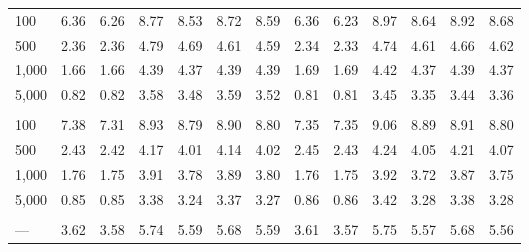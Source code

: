 \documentclass[AMA,STIX1COL,doublespace]{WileyNJD-v2}
\begin{document}
\begin{table}
\begin{tabular}[t]{lcccccccccccc}
\hline
\hspace{1em}100 & 6.36 & 6.26 & 8.77 & 8.53 & 8.72 & 8.59 & 6.36 & 6.23 & 8.97 & 8.64 & 8.92 & 8.68\\
\hspace{1em}500 & 2.36 & 2.36 & 4.79 & 4.69 & 4.61 & 4.59 & 2.34 & 2.33 & 4.74 & 4.61 & 4.66 & 4.62\\
\hspace{1em}1,000 & 1.66 & 1.66 & 4.39 & 4.37 & 4.39 & 4.39 & 1.69 & 1.69 & 4.42 & 4.37 & 4.39 & 4.37\\
\hspace{1em}5,000 & 0.82 & 0.82 & 3.58 & 3.48 & 3.59 & 3.52 & 0.81 & 0.81 & 3.45 & 3.35 & 3.44 & 3.36\\
\addlinespace[0.75em]
\multicolumn{13}{l}{\textbf{10 predictors, 490 junk}}\\
\hline
\hspace{1em}100 & 7.38 & 7.31 & 8.93 & 8.79 & 8.90 & 8.80 & 7.35 & 7.35 & 9.06 & 8.89 & 8.91 & 8.80\\
\hspace{1em}500 & 2.43 & 2.42 & 4.17 & 4.01 & 4.14 & 4.02 & 2.45 & 2.43 & 4.24 & 4.05 & 4.21 & 4.07\\
\hspace{1em}1,000 & 1.76 & 1.75 & 3.91 & 3.78 & 3.89 & 3.80 & 1.76 & 1.75 & 3.92 & 3.72 & 3.87 & 3.75\\
\hspace{1em}5,000 & 0.85 & 0.85 & 3.38 & 3.24 & 3.37 & 3.27 & 0.86 & 0.86 & 3.42 & 3.28 & 3.38 & 3.28\\
\addlinespace[0.75em]
\multicolumn{13}{l}{\textbf{Overall}}\\
\hline
\hspace{1em}--- & 3.62 & 3.58 & 5.74 & 5.59 & 5.68 & 5.59 & 3.61 & 3.57 & 5.75 & 5.57 & 5.68 & 5.56\\
\bottomrule
\end{tabular}
\end{table}
\end{document}
